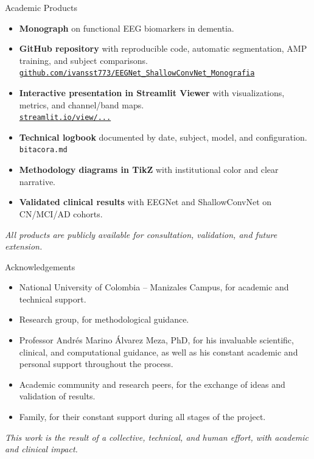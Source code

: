 \documentclass{beamer}
\begin{document}
\begin{frame}{Academic Products}
\small
\vspace{-0.2cm}
\begin{itemize}
  \item \textbf{Monograph} on functional EEG biomarkers in dementia.
  \item \textbf{GitHub repository} with reproducible code, automatic segmentation, AMP training, and subject comparisons.\\
  \texttt{\href{https://github.com/ivansst773/EEGNet_ShallowConvNet_Monografia}{github.com/ivansst773/EEGNet\_ShallowConvNet\_Monografia}}
  \item \textbf{Interactive presentation in Streamlit Viewer} with visualizations, metrics, and channel/band maps.\\
  \texttt{\href{https://streamlit.io/view/ivansst773/eegnet_shallowconvnet_monografia}{streamlit.io/view/...}}
  \item \textbf{Technical logbook} documented by date, subject, model, and configuration.\\
  \texttt{bitacora.md}
  \item \textbf{Methodology diagrams in TikZ} with institutional color and clear narrative.
  \item \textbf{Validated clinical results} with EEGNet and ShallowConvNet on CN/MCI/AD cohorts.
\end{itemize}
\vspace{0.3cm}
\scriptsize
\textit{All products are publicly available for consultation, validation, and future extension.}
\end{frame}


\begin{frame}{Acknowledgements}
\small
\vspace{-0.2cm}
\begin{itemize}
  \item National University of Colombia – Manizales Campus, for academic and technical support.
  \item Research group, for methodological guidance.
  \item Professor Andrés Marino Álvarez Meza, PhD, for his invaluable scientific, clinical, and computational guidance, as well as his constant academic and personal support throughout the process.
  \item Academic community and research peers, for the exchange of ideas and validation of results.
  \item Family, for their constant support during all stages of the project.
\end{itemize}
\vspace{0.3cm}
\scriptsize
\textit{This work is the result of a collective, technical, and human effort, with academic and clinical impact.}
\end{frame}
\end{document}
